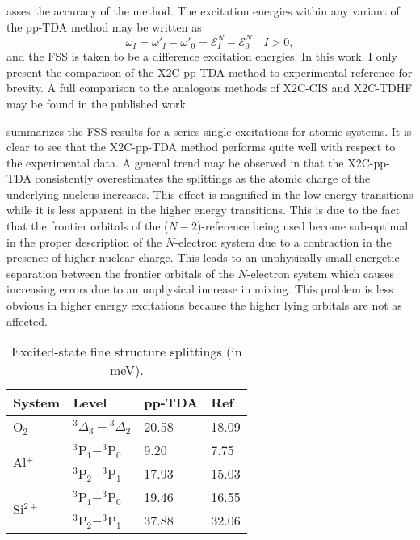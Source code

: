 asses the accuracy of the method. The excitation energies within any variant of
the pp-TDA method may be written as
\begin{equation}
\omega_I = \omega'_I - \omega'_0 = \mathcal{E}_I^{N} - \mathcal{E}_0^N 
\quad I > 0,
\end{equation}
and the FSS is taken to be a difference excitation energies.  In this work, I
only present the comparison of the X2C-pp-TDA method to experimental reference
for brevity. A full comparison to the analogous methods of X2C-CIS and X2C-TDHF
may be found in the published work\cite{DBWY16_Accepted1}.

 summarizes the FSS results for a series single excitations
for atomic systems. It is clear to see that the X2C-pp-TDA method performs quite
well with respect to the experimental data. A general trend may be observed in
that the X2C-pp-TDA consistently overestimates the splittings as the atomic
charge of the underlying nucleus increases. This effect is magnified in the low
energy transitions while it is less apparent in the higher energy transitions.
This is due to the fact that the frontier orbitals of the ($N-2$)-reference
being used become sub-optimal in the proper description of the $N$-electron
system due to a contraction in the presence of higher nuclear charge. This leads
to an unphysically small energetic separation between the frontier orbitals of
the $N$-electron system which causes increasing errors due to an unphysical
increase in mixing. This problem is less obvious in higher energy excitations
because the higher lying orbitals are not as affected.
\begin{wraptable}{hr}{0.45\textwidth}
 \vspace{-0.5cm}
  \caption{\footnotesize Excited-state fine structure splittings (in meV).}
 \label{tb:DoubleEx}
 \centering
 \begin{tabular}{llll}
 System                    & Level & pp-TDA & Ref\cite{NIST_ASD,Krupenie72_423}\\
 \hline
  O$_2$ & $^3\Delta_3-{^3\Delta_2}$ & 20.58 & 18.09 \\ \hline
  \multirow{2}{*}{Al$^+$} & $^3$P$_1-^3$P$_0$ & 9.20 & 7.75 \\ 
  & $^3$P$_2-^3$P$_1$ & 17.93 & 15.03 \\  \hline
  \multirow{2}{*}{Si$^{2+}$} & $^3$P$_1-^3$P$_0$ & 19.46 & 16.55 \\ 
  & $^3$P$_2-^3$P$_1$ & 37.88 & 32.06 \\    \hline
 \end{tabular}
 \vspace{-0.5cm}
\end{wraptable}

